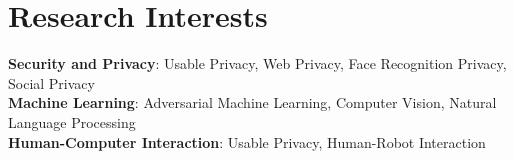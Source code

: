 \section{Research Interests}
 \begin{itemize}[leftmargin=0.5cm, label={}]
    \small{\item{
     \textbf{Security and Privacy}{: Usable Privacy, Web Privacy, Face Recognition Privacy, Social Privacy} \\
     \textbf{Machine Learning}{: Adversarial Machine Learning, Computer Vision, Natural Language Processing} \\
     \textbf{Human-Computer Interaction}{: Usable Privacy, Human-Robot Interaction} \\
    }}
 \end{itemize}